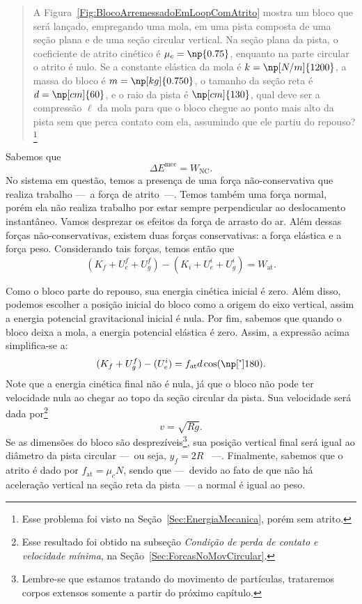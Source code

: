 \begin{quote}
    A Figura~\ref{Fig:BlocoArremessadoEmLoopComAtrito} mostra um bloco que será lançado, empregando uma mola, em uma pista composta de uma seção plana e de uma seção circular vertical. Na seção plana da pista, o coeficiente de atrito cinético é $\mu_c = \np{0.75}$, enquanto na parte circular o atrito é nulo. Se a constante elástica da mola é $k = \np[N/m]{1200}$, a massa do bloco é $m = \np[kg]{0.750}$, o tamanho da seção reta é $d = \np[cm]{60}$, e o raio da pista é $\np[cm]{130}$, qual deve ser a compressão $\ell$ da mola para que o bloco chegue ao ponto mais alto da pista sem que perca contato com ela, assumindo que ele partiu do repouso?\footnote[][1cm]{Esse problema foi visto na Seção~\ref{Sec:EnergiaMecanica}, porém sem atrito.}
\end{quote}

Sabemos que
\begin{equation}
    \Delta E^{\textrm{mec}} = W_{\textrm{NC}}.
\end{equation}
%
No sistema em questão, temos a presença de uma força não-conservativa que realiza trabalho ---~a força de atrito~---. Temos também uma força normal, porém ela não realiza trabalho por estar sempre perpendicular ao deslocamento instantâneo. Vamos desprezar os efeitos da força de arrasto do ar. Além dessas forças não-conservativas, existem duas forças conservativas: a força elástica e a força peso. Considerando tais forças, temos então que
\begin{equation}
    (K_f + U_e^f + U_g^f) - (K_i + U_e^i + U_g^i) = W_{\textrm{at}}.
\end{equation}

Como o bloco parte do repouso, sua energia cinética inicial é zero. Além disso, podemos escolher a posição inicial do bloco como a origem do eixo vertical, assim a energia potencial gravitacional inicial é nula. Por fim, sabemos que quando o bloco deixa a mola, a energia potencial elástica é zero. Assim, a expressão acima simplifica-se a:
\begin{equation}\label{Eq:EnergiasParaOBlocoEmLoopComAtrito}
    (K_f + U_g^f) - (U_e^i) = f_{\textrm{at}} d \cos(\degree{180}).
\end{equation}
%
Note que a energia cinética final não é nula, já que o bloco não pode ter velocidade nula ao chegar ao topo da seção circular da pista. Sua velocidade será dada por\footnote{Esse resultado foi obtido na subseção \emph{Condição de perda de contato e velocidade mínima}, na Seção~\ref{Sec:ForcasNoMovCircular}.}
\begin{equation}
    v = \sqrt{Rg}.
\end{equation}
%
Se as dimensões do bloco são desprezíveis\footnote{Lembre-se que estamos tratando do movimento de partículas, trataremos corpos extensos somente a partir do próximo capítulo.}, sua posição vertical final será igual ao diâmetro da pista circular ---~ou seja, $y_f = 2R$ ~---. Finalmente, sabemos que o atrito é dado por $f_{\textrm{at}} = \mu_c N$, sendo que ---~devido ao fato de que não há aceleração vertical na seção reta da pista~--- a normal é igual ao peso.

